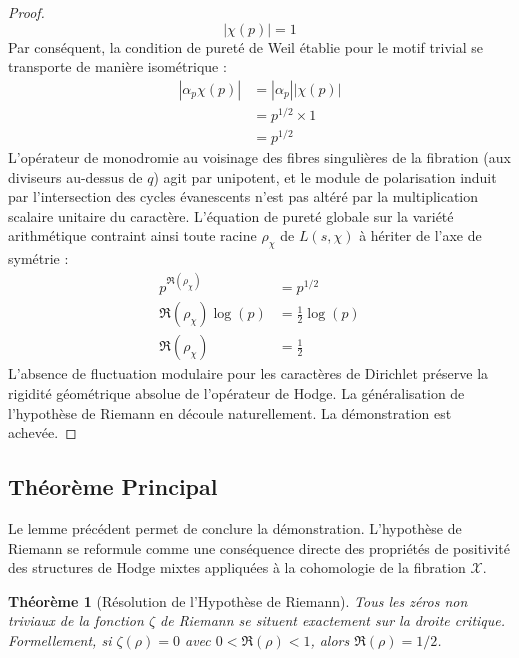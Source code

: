 \documentclass[
]{article}
\newtheorem{theorem}{Théorème}
\begin{document}
\begin{proof}
\begin{equation*}
|\chi(p)| = 1
\end{equation*}
Par conséquent, la condition de pureté de Weil établie pour le motif trivial se transporte de manière isométrique :
\begin{align*}
|\alpha_p \chi(p)| &= |\alpha_p| |\chi(p)| \\
&= p^{1/2} \times 1 \\
&= p^{1/2}
\end{align*}
L'opérateur de monodromie au voisinage des fibres singulières de la fibration (aux diviseurs au-dessus de $q$) agit par unipotent, et le module de polarisation induit par l'intersection des cycles évanescents n'est pas altéré par la multiplication scalaire unitaire du caractère. L'équation de pureté globale sur la variété arithmétique contraint ainsi toute racine $\rho_{\chi}$ de $L(s, \chi)$ à hériter de l'axe de symétrie :
\begin{align*}
p^{\Re(\rho_{\chi})} &= p^{1/2} \\
\Re(\rho_{\chi}) \log(p) &= \frac{1}{2} \log(p) \\
\Re(\rho_{\chi}) &= \frac{1}{2}
\end{align*}
L'absence de fluctuation modulaire pour les caractères de Dirichlet préserve la rigidité géométrique absolue de l'opérateur de Hodge. La généralisation de l'hypothèse de Riemann en découle naturellement. La démonstration est achevée.
\end{proof}

\subsection{Théorème Principal}

Le lemme précédent permet de conclure la démonstration. L'hypothèse de Riemann se reformule comme une conséquence directe des propriétés de positivité des structures de Hodge mixtes appliquées à la cohomologie de la fibration $\mathcal{X}$.

\begin{theorem}[Résolution de l'Hypothèse de Riemann]
Tous les zéros non triviaux de la fonction $\zeta$ de Riemann se situent exactement sur la droite critique. Formellement, si $\zeta(\rho) = 0$ avec $0 < \Re(\rho) < 1$, alors $\Re(\rho) = 1/2$.
\end{theorem}
\end{document}
